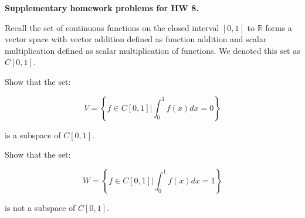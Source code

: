 \documentclass[10pt]{exam}
\begin{document}
{\bf Supplementary homework problems for HW 8.}

\begin{questions}


\question 
{}

\question Recall the set of continuous functions on the closed interval $[0,1]$ to $\mathbb{R}$ forms a vector space with vector addition defined as function addition and scalar multiplication defined as scalar multiplication of functions.  We denoted this set as $C[0,1]$.

Show that the set:

\[ V = \left \{ f\in C[0,1] \Big | \int_0^1 f(x)dx =0  \right\}\]

is a subspace of $C[0,1]$.  

\question Show that the set:

\[ W = \left \{ f\in C[0,1] \Big | \int_0^1 f(x)dx =1  \right\}\]

is not a subspace of $C[0,1]$.  




\end{questions}
\end{document}

